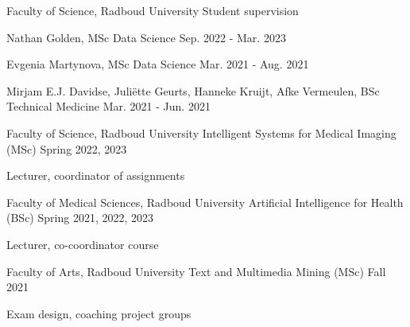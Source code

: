 

\begin{cventries}

  \cventry
    {Faculty of Science, Radboud University} %
    {Student supervision} %
    {} %
    {} %
    {
      \begin{cvitems} %
        \item {Nathan Golden, MSc Data Science\hspace*{\fill} Sep. 2022 - Mar. 2023}
        \item {Evgenia Martynova, MSc Data Science\hspace*{\fill} Mar. 2021 - Aug. 2021}
        \item {Mirjam E.J. Davidse, Juliëtte Geurts, Hanneke Kruijt, Afke Vermeulen, BSc Technical Medicine\hspace*{\fill} Mar. 2021 - Jun. 2021}
      \end{cvitems}
    }

  \cventry
    {Faculty of Science, Radboud University} %
    {Intelligent Systems for Medical Imaging (MSc)} %
    {}
    {Spring 2022, 2023} %
    {
      \begin{cvitems} %
        \item {Lecturer, coordinator of assignments}
      \end{cvitems}
    }

  \cventry
    {Faculty of Medical Sciences, Radboud University} %
    {Artificial Intelligence for Health (BSc)} %
    {}
    {Spring 2021, 2022, 2023} %
    {
      \begin{cvitems} %
        \item {Lecturer, co-coordinator course}
      \end{cvitems}
    }

  \cventry
    {Faculty of Arts, Radboud University} %
    {Text and Multimedia Mining (MSc)} %
    {}
    {Fall 2021} %
    {
      \begin{cvitems} %
        \item {Exam design, coaching project groups}
      \end{cvitems}
    }


\end{cventries}

